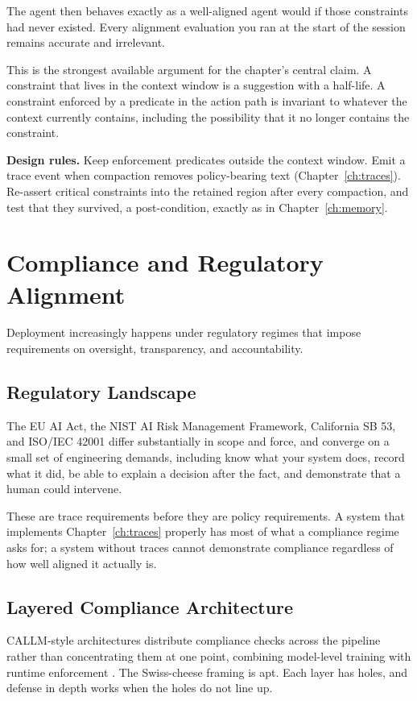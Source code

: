 The agent then behaves exactly as a well-aligned agent would if those constraints
had never existed. Every alignment evaluation you ran at the start of the session
remains accurate and irrelevant.

This is the strongest available argument for the chapter's central claim. A
constraint that lives in the context window is a suggestion with a half-life. A
constraint enforced by a predicate in the action path is invariant to whatever the
context currently contains, including the possibility that it no longer contains
the constraint.

\textbf{Design rules.} Keep enforcement predicates outside the context window.
Emit a trace event when compaction removes policy-bearing text
(Chapter~\ref{ch:traces}). Re-assert critical constraints into the retained region
after every compaction, and test that they survived, a post-condition, exactly
as in Chapter~\ref{ch:memory}.

\section{Compliance and Regulatory Alignment}

Deployment increasingly happens under regulatory regimes that impose requirements
on oversight, transparency, and accountability.

\subsection{Regulatory Landscape}

The EU AI Act, the NIST AI Risk Management Framework, California SB 53, and
ISO/IEC 42001 differ substantially in scope and force, and converge on a small set
of engineering demands, including know what your system does, record what it did, be able to
explain a decision after the fact, and demonstrate that a human could intervene.

These are trace requirements before they are policy requirements. A system that
implements Chapter~\ref{ch:traces} properly has most of what a compliance regime
asks for; a system without traces cannot demonstrate compliance regardless of how
well aligned it actually is.

\subsection{Layered Compliance Architecture}

CALLM-style architectures distribute compliance checks across the pipeline rather
than concentrating them at one point, combining model-level training with runtime
enforcement \cite{callm2025}. The Swiss-cheese framing is apt. Each layer has
holes, and defense in depth works when the holes do not line up.

